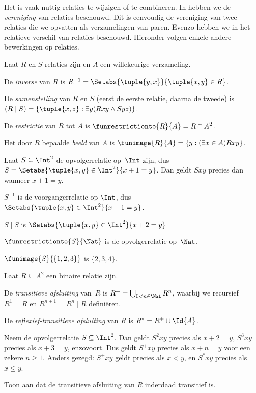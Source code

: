 \documentclass[../../../include/open-logic-section]{subfiles}
\begin{document}

Het is vaak nuttig relaties te wijzigen of te combineren. In
 hebben we de \emph{vereniging}
van relaties beschouwd. Dit is eenvoudig de vereniging van twee relaties die
we opvatten als verzamelingen van paren. Evenzo hebben we in
 het relatieve verschil van relaties
beschouwd. Hieronder volgen enkele andere bewerkingen op relaties.

\begin{defn} 
Laat $R$ en $S$ relaties zijn en $A$ een willekeurige verzameling.

De \emph{inverse} van $R$ is $R^{-1} = \Setabs{\tuple{y, x}}{\tuple{x,
    y} \in R}$.

De \emph{samenstelling} van $R$ en $S$ (eerst de eerste relatie, daarna de
tweede) is $(R \mid S) =
\{\tuple{x, z} : \exists y(Rxy \land Syz)\}$.

De \emph{restrictie} van $R$ tot $A$ is $\funrestrictionto{R}{A}= R
\cap A^2$.

Het door $R$ bepaalde \emph{beeld} van $A$ is $\funimage{R}{A} = \{y :
(\exists x \in A)Rxy\}$.
\end{defn}

\begin{ex}
Laat $S \subseteq \Int^2$ de opvolgerrelatie op~$\Int$ zijn, dus
$S = \Setabs{\tuple{x, y} \in \Int^2}{x + 1 = y}$. Dan geldt $Sxy$ precies
dan wanneer $x + 1 = y$.

$S^{-1}$ is de voorgangerrelatie op $\Int$, dus
$\Setabs{\tuple{x,y}\in\Int^2}{x -1 =y}$.

$S\mid S$ is
$ \Setabs{\tuple{x,y}\in\Int^2}{x + 2 =y}$

$\funrestrictionto{S}{\Nat}$ is de opvolgerrelatie op~$\Nat$.

$\funimage{S}{\{1,2,3\}}$ is $\{2, 3, 4\}$.
\end{ex}

\begin{defn}Laat $R \subseteq A^2$ een binaire relatie zijn.
	
De \emph{transitieve afsluiting} van~$R$ is $R^+ = \bigcup_{0 < n \in
\Nat} R^n$, waarbij we recursief $R^1 = R$ en $R^{n+1} = R^n
\mid R$ definiëren.

De \emph{reflexief-transitieve afsluiting} van $R$ is $R^* = R^+ \cup
\Id{A}$.
\end{defn}

\begin{ex}
Neem de opvolgerrelatie $S \subseteq \Int^2$. Dan geldt $S^2xy$ precies als
$x + 2 = y$, $S^3xy$ precies als $x + 3 = y$, enzovoort. Dus geldt $S^+xy$
precies als $x + n = y$ voor een zekere $n \geq 1$. Anders gezegd: $S^+xy$
geldt precies als $x < y$, en $S^*xy$ precies als $x \le y$.
\end{ex}

\begin{prob}
Toon aan dat de transitieve afsluiting van $R$ inderdaad transitief is.
\end{prob}
\end{document}
